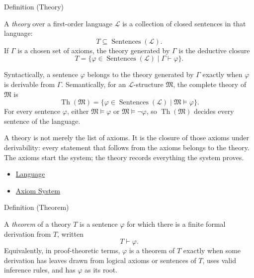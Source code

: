 \begin{definitionbox}{Definition (Theory)}
\begin{definition}[Theory]
\label{def:axiom-systems-theory}
A \emph{theory} over a first-order language $\mathcal{L}$ is a collection of
closed sentences in that language:
\[
  T\subseteq\operatorname{Sentences}(\mathcal{L}).
\]
If $\Gamma$ is a chosen set of axioms, the theory generated by $\Gamma$ is the
deductive closure
\[
  T=\{\varphi\in\operatorname{Sentences}(\mathcal{L})\mid
      \Gamma\vdash\varphi\}.
\]
\end{definition}
\end{definitionbox}

\begin{remark*}
Syntactically, a sentence $\varphi$ belongs to the theory generated by
$\Gamma$ exactly when $\varphi$ is derivable from $\Gamma$. Semantically, for
an $\mathcal{L}$-structure $\mathfrak{M}$, the complete theory of
$\mathfrak{M}$ is
\[
  \operatorname{Th}(\mathfrak{M})
  =\{\varphi\in\operatorname{Sentences}(\mathcal{L})\mid
      \mathfrak{M}\vDash\varphi\}.
\]
For every sentence $\varphi$, either $\mathfrak{M}\vDash\varphi$ or
$\mathfrak{M}\vDash\neg\varphi$, so $\operatorname{Th}(\mathfrak{M})$
decides every sentence of the language.
\end{remark*}

\begin{remark*}[Interpretation]
A theory is not merely the list of axioms. It is the closure of those axioms
under derivability: every statement that follows from the axioms belongs to
the theory. The axioms start the system; the theory records everything the
system proves.
\end{remark*}

\begin{dependencies}
\begin{itemize}
  \item \hyperref[def:language]{Language}
  \item \hyperref[def:axiom-system]{Axiom System}
\end{itemize}
\end{dependencies}

\begin{definitionbox}{Definition (Theorem)}
\begin{definition}[Theorem]
\label{def:axiom-systems-theorem}
A \emph{theorem} of a theory $T$ is a sentence $\varphi$ for which there is a
finite formal derivation from $T$, written
\[
  T\vdash\varphi.
\]
Equivalently, in proof-theoretic terms, $\varphi$ is a theorem of $T$ exactly
when some derivation has leaves drawn from logical axioms or sentences of
$T$, uses valid inference rules, and has $\varphi$ as its root.
\end{definition}
\end{definitionbox}

